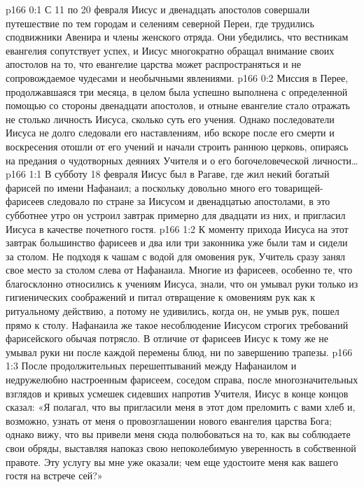 \vs p166 0:1 С 11 по 20 февраля Иисус и двенадцать апостолов совершали путешествие по тем городам и селениям северной Переи, где трудились сподвижники Авенира и члены женского отряда. Они убедились, что вестникам евангелия сопутствует успех, и Иисус многократно обращал внимание своих апостолов на то, что евангелие царства может распространяться и не сопровождаемое чудесами и необычными явлениями.
\vs p166 0:2 Миссия в Перее, продолжавшаяся три месяца, в целом была успешно выполнена с определенной помощью со стороны двенадцати апостолов, и отныне евангелие стало отражать не столько личность Иисуса, сколько суть его учения. Однако последователи Иисуса не долго следовали его наставлениям, ибо вскоре после его смерти и воскресения отошли от его учений и начали строить раннюю церковь, опираясь на предания о чудотворных деяниях Учителя и о его богочеловеческой личности\ldots
{}
\vs p166 1:1 В субботу 18 февраля Иисус был в Рагаве, где жил некий богатый фарисей по имени Нафанаил; а поскольку довольно много его товарищей\hyp{}фарисеев следовало по стране за Иисусом и двенадцатью апостолами, в это субботнее утро он устроил завтрак примерно для двадцати из них, и пригласил Иисуса в качестве почетного гостя.
\vs p166 1:2 К моменту прихода Иисуса на этот завтрак большинство фарисеев и два или три законника уже были там и сидели за столом. Не подходя к чашам с водой для омовения рук, Учитель сразу занял свое место за столом слева от Нафанаила. Многие из фарисеев, особенно те, что благосклонно относились к учениям Иисуса, знали, что он умывал руки только из гигиенических соображений и питал отвращение к омовениям рук как к ритуальному действию, а потому не удивились, когда он, не умыв рук, пошел прямо к столу. Нафанаила же такое несоблюдение Иисусом строгих требований фарисейского обычая потрясло. В отличие от фарисеев Иисус к тому же не умывал руки ни после каждой перемены блюд, ни по завершению трапезы.
\vs p166 1:3 После продолжительных перешептываний между Нафанаилом и недружелюбно настроенным фарисеем, соседом справа, после многозначительных взглядов и кривых усмешек сидевших напротив Учителя, Иисус в конце концов сказал: «Я полагал, что вы пригласили меня в этот дом преломить с вами хлеб и, возможно, узнать от меня о провозглашении нового евангелия царства Бога; однако вижу, что вы привели меня сюда полюбоваться на то, как вы соблюдаете свои обряды, выставляя напоказ свою непоколебимую уверенность в собственной правоте. Эту услугу вы мне уже оказали; чем еще удостоите меня как вашего гостя на встрече сей?»
